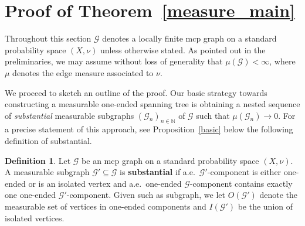 \documentclass[letterpaper,11pt,reqno]{amsart}
\theoremstyle{bfnote}
\newtheorem{prop}[theorem]{Proposition}
\theoremstyle{definition}
\newtheorem{definition}[theorem]{Definition}
\newcommand{\0}{\varnothing}
\renewcommand{\epsilon}{\varepsilon}
\newcommand{\eps}{\epsilon}
\renewcommand{\leq}{\leqslant}
\numberwithin{equation}{section}
\begin{document}

    
\section{Proof of Theorem~\ref{measure_main}}\label{sec:proof}

Throughout this section $\mathcal{G}$ denotes a locally finite mcp graph on a standard probability space $(X,\nu)$ unless otherwise stated. As pointed out in the preliminaries, we may assume without loss of generality that $\mu (\mathcal G) < \infty$, where $\mu$ denotes the edge measure associated to $\nu$.

We proceed to sketch an outline of the proof. Our basic strategy towards constructing a measurable one-ended spanning tree is obtaining a nested sequence of \emph{substantial} measurable subgraphs $(\mathcal G_n)_{n\in \mathbb N}$ of $\mathcal{G}$ such that $\mu(\mathcal{G}_n)\to0$. For a precise statement of this approach, see Proposition~\ref{basic} below the following definition of substantial.

\begin{definition}
    Let $\mathcal{G}$ be an mcp graph on a standard probability space $(X,\nu)$. A measurable subgraph $\mathcal{G}'\subseteq \mathcal{G}$ is \textbf{substantial} if a.e.\ $\mathcal{G}'$-component is either one-ended or is an isolated vertex and a.e.\ one-ended $\mathcal{G}$-component contains exactly one one-ended $\mathcal{G}'$-component. Given such as subgraph, we let $O (\mathcal{G}')$ denote the measurable set of vertices in one-ended components and $I(\mathcal{G}')$ be the union of isolated vertices.
\end{definition}
\end{document}
